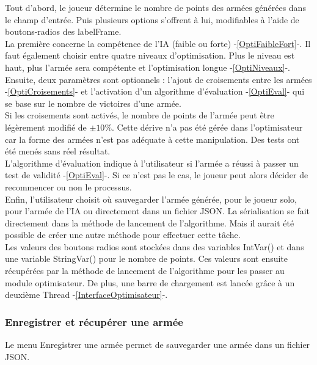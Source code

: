 \documentclass[a4paper]{article} %
\begin{document}
Tout d'abord, le joueur détermine le nombre de points des armées générées dans le champ d'entrée. 
Puis plusieurs options s'offrent à lui, modifiables à l'aide de boutons-radios des labelFrame.
\\
La première concerne la compétence de l'IA (faible ou forte) -\ref{OptiFaibleFort}-. Il faut également choisir entre quatre niveaux d'optimisation. Plus le niveau est haut, plus l'armée sera compétente et l'optimisation longue -\ref{OptiNiveaux}-.
\\
Ensuite, deux paramètres sont optionnels : l'ajout de croisements entre les armées -\ref{OptiCroisements}- et l'activation d'un algorithme d'évaluation -\ref{OptiEval}- qui se base sur le nombre de victoires d'une armée.\\

Si les croisements sont activés, le nombre de points de l'armée peut être légèrement modifié de $\pm 10\%$. Cette dérive n'a pas été gérée dans l'optimisateur car la forme des armées n'est pas adéquate à cette manipulation. Des tests ont été menés sans réel résultat.\\

L'algorithme d'évaluation indique à l'utilisateur si l'armée a réussi à passer un test de validité -\ref{OptiEval}-. Si ce n'est pas le cas, le joueur peut alors décider de recommencer ou non le processus.
\\
Enfin, l'utilisateur choisit où sauvegarder l'armée générée, pour le joueur solo, pour l'armée de l'IA ou directement dans un fichier JSON. La sérialisation se fait directement dans la méthode de lancement de l'algorithme. Mais il aurait été possible de créer une autre méthode pour effectuer cette tâche.\\

Les valeurs des boutons radios sont stockées dans des variables IntVar() et dans une variable StringVar() pour le nombre de points. Ces valeurs sont ensuite récupérées par la méthode de lancement de l'algorithme pour les passer au module optimisateur. De plus, une barre de chargement est lancée grâce à un deuxième Thread -\ref{InterfaceOptimisateur}-.

		\subsubsection{Enregistrer et récupérer une armée}\label{enregistrerRecuperer}
Le menu Enregistrer une armée permet de sauvegarder une armée dans un fichier JSON.\\
\end{document}
